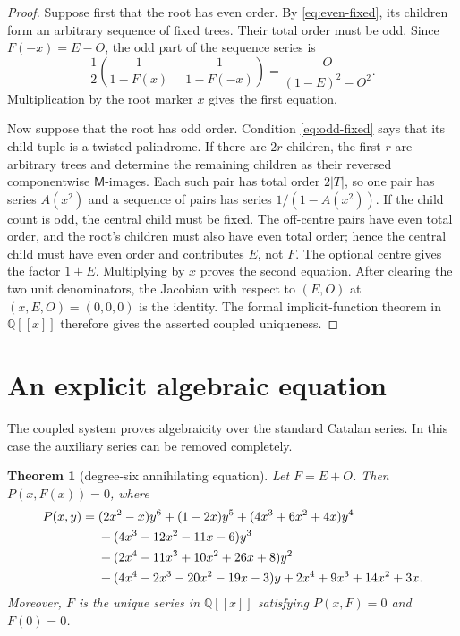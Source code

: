 \documentclass[10pt,a4paper]{amsart}
\newtheorem{theorem}{Theorem}[section]
\theoremstyle{definition}
\theoremstyle{remark}
\newcommand{\M}{\mathsf M}
\begin{document}
\begin{proof}
Suppose first that the root has even order.  By
\eqref{eq:even-fixed}, its children form an arbitrary sequence of fixed
trees.  Their total order must be odd.  Since $F(-x)=E-O$, the odd part of
the sequence series is
\[
 \frac12\left(\frac1{1-F(x)}-\frac1{1-F(-x)}\right)
 =\frac{O}{(1-E)^2-O^2}.
\]
Multiplication by the root marker $x$ gives the first equation.

Now suppose that the root has odd order.  Condition
\eqref{eq:odd-fixed} says that its child tuple is a twisted palindrome.  If
there are $2r$ children, the first $r$ are arbitrary trees and determine the
remaining children as their reversed componentwise $\M$-images.  Each such
pair has total order $2|T|$, so one pair has series $A(x^2)$ and a sequence of
pairs has series $1/(1-A(x^2))$.  If the child count is odd, the central
child must be fixed.  The off-centre pairs have even total order, and the
root's children must also have even total order; hence the central child must
have even order and contributes $E$, not $F$.  The optional centre gives the
factor $1+E$.  Multiplying by $x$ proves the second equation.  After clearing
the two unit denominators, the Jacobian with respect to $(E,O)$ at
$(x,E,O)=(0,0,0)$ is the identity.  The formal implicit-function theorem in
$\mathbb Q[[x]]$ therefore gives the asserted coupled uniqueness.
\end{proof}

\section{An explicit algebraic equation}\label{sec:algebraic}

The coupled system proves algebraicity over the standard Catalan series.  In
this case the auxiliary series can be removed completely.

\begin{theorem}[degree-six annihilating equation]\label{thm:polynomial}
Let $F=E+O$.  Then $P(x,F(x))=0$, where
\begin{align}
P(x,y)={}&(2x^2-x)y^6+(1-2x)y^5
 +(4x^3+6x^2+4x)y^4 \notag\\
&+(4x^3-12x^2-11x-6)y^3 \notag\\
&+(2x^4-11x^3+10x^2+26x+8)y^2 \label{eq:polynomial}\\
&+(4x^4-2x^3-20x^2-19x-3)y
 +2x^4+9x^3+14x^2+3x. \notag
\end{align}
Moreover, $F$ is the unique series in $\mathbb Q[[x]]$ satisfying
$P(x,F)=0$ and $F(0)=0$.
\end{theorem}
\end{document}

